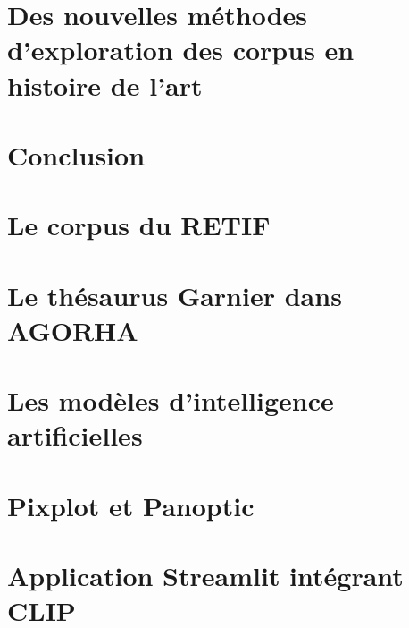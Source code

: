 \documentclass[12pt,twoside]{book}
\begin{document}
\chapter[Nouvelles méthodes d'exploration]{Des nouvelles méthodes d’exploration des corpus en histoire de l’art}

	
	
	\chapter*{Conclusion}
	

\newpage{\pagestyle{empty}\cleardoublepage}
	







\appendix %

\chapter{Le corpus du RETIF}



\chapter{Le thésaurus Garnier dans AGORHA}



\chapter{Les modèles d'intelligence artificielles}



\chapter{Pixplot et Panoptic}



\chapter{Application Streamlit intégrant CLIP}



\newpage{\pagestyle{empty}\cleardoublepage}


\backmatter %

\tableofcontents
\end{document}
